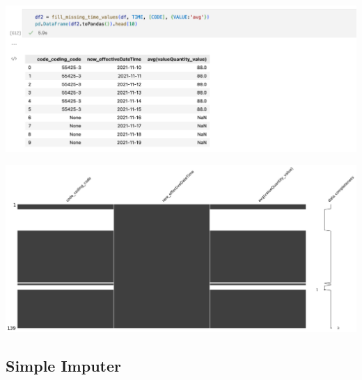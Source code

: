 \documentclass[11pt, oneside]{article}
\begin{document}
\begin{center}
\includegraphics[scale=0.4]{3_fill_time_df.png}
\end{center}
\begin{center}
\includegraphics[scale=0.2]{2_msn_df2.png}
\end{center}

\subsection{Simple Imputer}
\end{document}
